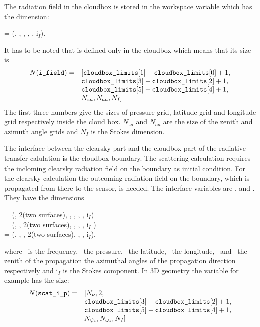 \vspace{1ex} The radiation field in the cloudbox is stored in the
workspace variable  which has the dimension:
\begin{center}
   =  (\Prs, \Lat, \Lon, \ScaZa,
  \ScaAa, i$_I$).
\end{center}
It has to be noted that  is defined only in the
cloudbox which means that its size is
\[ \begin{array}{rl}
 N(\texttt{i\_field}) =& [\texttt{cloudbox\_limits}[1] - \texttt{cloudbox\_limits}[0] + 1,\\
              &\texttt{cloudbox\_limits}[3] -\texttt{cloudbox\_limits}[2] + 1, \\
              &\texttt{cloudbox\_limits}[5] -\texttt{cloudbox\_limits}[4] + 1,  \\
              & N_{za}, N_{aa}, N_{I} ] 
\end{array}\]
The first three numbers give the sizes of pressure grid, latitude grid
and longitude grid respectively inside the cloud box. $N_{za}$ and
$N_{aa}$ are the size of the zenith and azimuth angle grids and
$N_{I}$ is the Stokes dimension.


\label{sec:scattering:interface}
The interface between the clearsky part and the cloudbox part of the
radiative transfer calulation is the cloudbox boundary. The scattering
calculation requires the incloming clearsky radiation field on the
boundary as initial condition. For the clearsky calculation the
outcoming radiation field on the boundary, which is propagated from
there to the sensor, is needed.  The interface variables are
,  and
. They have the dimensions
\begin{center}
   =  (\Frq, 2(two surfaces), \Lat, \Lon, \ScaZa, \ScaAa, i$_I$)\\
   =  (\Frq, \Prs,
  2(two surfaces), \Lon, \ScaZa,
  \ScaAa, i$_I$ )\\
   =  (\Frq, \Prs,
  \Lat, 2(two surfaces), \ScaZa, \ScaAa, i$_I$).
\end{center}
where \Frq\ is the frequency, \Prs\ the pressure, \Lat\ the latitude,
\Lon\ the longitude, \ScaZa\ and \ScaAa\ the zenith of the propagation
the azimuthal angles of the propagation direction respectively and
i$_I$ is the Stokes component.  In 3D geometry the variable
 for example has the size:
\[ \begin{array}{rl}
  N(\texttt{scat\_i\_p}) =& [ N_{\nu}, 2,\\
   &\texttt{cloudbox\_limits}[3] -\texttt{cloudbox\_limits}[2] + 1, \\
   &\texttt{cloudbox\_limits}[5] -\texttt{cloudbox\_limits}[4] + 1,  \\
   &N_{{\psi_s}}, N_{{\omega_s}}, N_I]
\end{array} 
\] 

